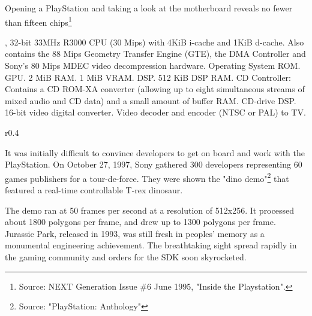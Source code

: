 \par
\vspace{15pt}
Opening a PlayStation and taking a look at the motherboard reveals no fewer than fifteen chips\footnote{Source: NEXT Generation Issue \#6 June 1995, "Inside the Playstation".}\\
\par
{}, 32-bit 33MHz R3000 CPU (30 Mips) with  4KiB i-cache and 1KiB d-cache. Also contains the 88 Mips Geometry Transfer Engine (GTE), the DMA Controller and Sony's 80 Mips MDEC video decompression hardware.
 Operating System ROM.
 GPU.
 2 MiB RAM.
 1 MiB VRAM.
 DSP.
 512 KiB DSP RAM.
 CD Controller: Contains a CD ROM-XA converter (allowing up to eight simultaneous streams of mixed audio and CD data) and a small amount of buffer RAM.
 CD-drive DSP.
 16-bit video digital converter.
 Video decoder and encoder (NTSC or PAL) to TV.


\par
\begin{wrapfigure}[10]{r}{0.4\textwidth}{
\centering {}}
\end{wrapfigure}
It was initially difficult to convince developers to get on board and work with the PlayStation. On October 27, 1997, Sony gathered 300 developers representing 60 games publishers for a tour-de-force. They were shown the "dino demo"\footnote{Source: "PlayStation: Anthology"} that featured a real-time controllable T-rex dinosaur.\\
\par The demo ran at 50 frames per second at a resolution of 512x256. It processed about 1800 polygons per frame, and drew up to 1300 polygons per frame. Jurassic Park, released in 1993, was still fresh in peoples' memory as a monumental engineering achievement. The breathtaking sight spread rapidly in the gaming community and orders for the SDK soon skyrocketed.
 
 






